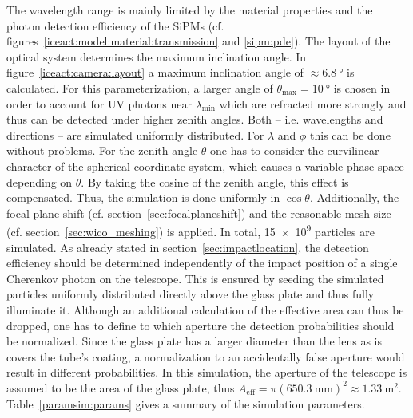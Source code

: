 The wavelength range is mainly limited by the material properties and the photon detection efficiency of the SiPMs (cf. figures~\ref{iceact:model:material:transmission} and \ref{sipm:pde}). The layout of the optical system determines the maximum inclination angle. In figure~\ref{iceact:camera:layout} a maximum inclination angle of $\approx\SI{6.8}{\degree}$ is calculated. For this parameterization, a larger angle of $\theta_\text{max}=\SI{10}{\degree}$ is chosen in order to account for UV photons near $\lambda_\text{min}$  which are refracted more strongly and thus can be detected under higher zenith angles. Both -- i.e. wavelengths and directions -- are simulated uniformly distributed. For $\lambda$ and $\phi$ this can be done without problems. For the zenith angle $\theta$ one has to consider the curvilinear character of the spherical coordinate system, which causes a variable phase space depending on $\theta$. By taking the cosine of the zenith angle, this effect is compensated. Thus, the simulation is done uniformly in $\cos{\theta}$. Additionally, the focal plane shift (cf. section~\ref{sec:focalplaneshift}) and the reasonable mesh size (cf. section~\ref{sec:wico_meshing}) is applied. In total, \num{15e9} particles are simulated. As already stated in section~\ref{sec:impactlocation}, the detection efficiency should be determined independently of the impact position of a single Cherenkov photon on the telescope. This is ensured by seeding the simulated particles uniformly distributed directly above the glass plate and thus fully illuminate it. Although an additional calculation of the effective area can thus be dropped, one has to define to which aperture the detection probabilities should be normalized. Since the glass plate has a larger diameter than the lens as is covers the tube's coating, a normalization to an accidentally false aperture would result in different probabilities. In this simulation, the aperture of the telescope is assumed to be the area of the glass plate, thus $A_\text{eff} = \pi(\SI{650.3}{\milli\meter})^2\approx\SI{1.33}{\meter\squared}$.
Table~\ref{paramsim:params} gives a summary of the simulation parameters.


